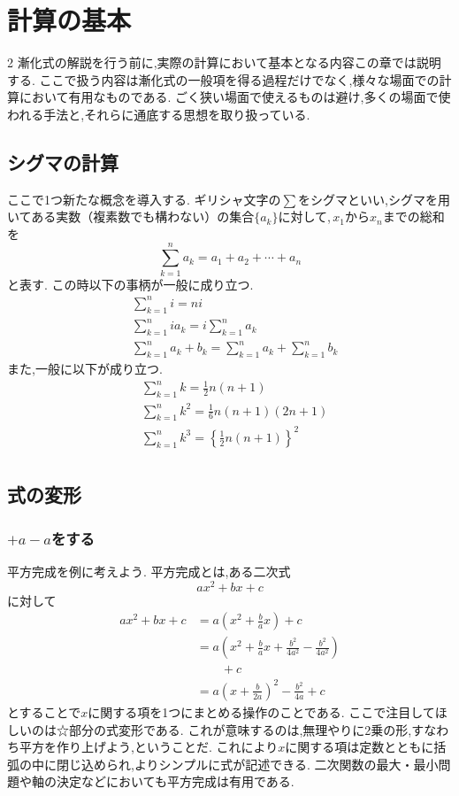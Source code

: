 \documentclass[dvipdfmx,a4paper,11pt,fleqn,openany]{jsbook}
\begin{document}
\chapter{計算の基本}
\begin{multicols*}{2}
  漸化式の解説を行う前に,実際の計算において基本となる内容この章では説明する.
  ここで扱う内容は漸化式の一般項を得る過程だけでなく,様々な場面での計算において有用なものである.
  ごく狭い場面で使えるものは避け,多くの場面で使われる手法と,それらに通底する思想を取り扱っている.
  \section{シグマの計算}
    ここで1つ新たな概念を導入する.
    ギリシャ文字の$\sum$をシグマといい,シグマを用いてある実数（複素数でも構わない）の集合$\{a_k\}$に対して,\,$x_1$から$x_n$までの総和を
    \[
      \sum_{k=1}^{n} a_k=a_1+a_2+\cdots+ a_n
    \]
    と表す.
    この時以下の事柄が一般に成り立つ.
    \begin{align*}
      &\sum_{k=1}^{n} i=ni\\
      &\sum_{k=1}^{n} ia_k=i\sum_{k=1}^{n} a_k\\
      &\sum_{k=1}^{n} a_k+b_k=\sum_{k=1}^{n} a_k+\sum_{k=1}^{n} b_k
    \end{align*}
    また,一般に以下が成り立つ.
    \begin{align*}
      &\sum_{k=1}^{n} k=\frac{1}{2}n(n+1)\\
      &\sum_{k=1}^{n} k^2=\frac{1}{6}n(n+1)(2n+1)\\
      &\sum_{k=1}^{n} k^3=\left\{\frac{1}{2}n(n+1)\right\}^2\\
    \end{align*}

  \section{式の変形}
    \subsection{$+a-a$をする}
      平方完成を例に考えよう.
      平方完成とは,ある二次式
      \[
        ax^2+bx+c
      \]
      に対して
      \begin{align*}
        ax^2+bx+c&=a\left(x^2+\frac{b}{a}x\right) +c\\
        &=a\left(x^2+\frac{b}{a}x+\frac{b^2}{4a^2}-\frac{b^2}{4a^2}\right)\\
        &\qquad +c \tag*{\(\cdots\) (☆)}\\
        &=a\left(x+\frac{b}{2a}\right)^2-\frac{b^2}{4a}+c
      \end{align*}
      とすることで$x$に関する項を1つにまとめる操作のことである.
      ここで注目してほしいのは☆部分の式変形である.
      これが意味するのは,無理やりに2乗の形,すなわち平方を作り上げよう,ということだ.
      これにより$x$に関する項は定数とともに括弧の中に閉じ込められ,よりシンプルに式が記述できる.
      二次関数の最大・最小問題や軸の決定などにおいても平方完成は有用である.


\end{multicols*}
\end{document}
